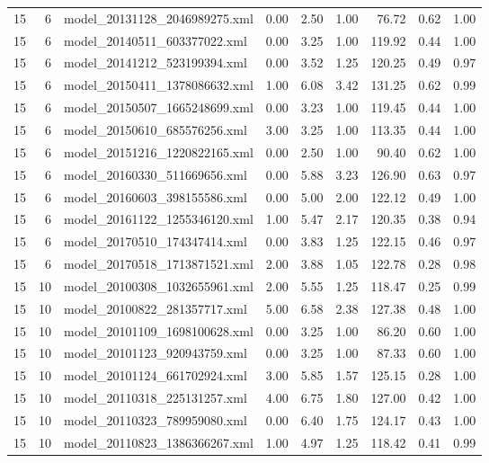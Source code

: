 \begin{table}[ht]
\begin{tabular}{rrlrrrrrr}
   15 &   6 & model\_20131128\_2046989275.xml & 0.00 & 2.50 & 1.00 & 76.72 & 0.62 & 1.00 \\ 
   15 &   6 & model\_20140511\_603377022.xml & 0.00 & 3.25 & 1.00 & 119.92 & 0.44 & 1.00 \\ 
   15 &   6 & model\_20141212\_523199394.xml & 0.00 & 3.52 & 1.25 & 120.25 & 0.49 & 0.97 \\ 
   15 &   6 & model\_20150411\_1378086632.xml & 1.00 & 6.08 & 3.42 & 131.25 & 0.62 & 0.99 \\ 
   15 &   6 & model\_20150507\_1665248699.xml & 0.00 & 3.23 & 1.00 & 119.45 & 0.44 & 1.00 \\ 
   15 &   6 & model\_20150610\_685576256.xml & 3.00 & 3.25 & 1.00 & 113.35 & 0.44 & 1.00 \\ 
   15 &   6 & model\_20151216\_1220822165.xml & 0.00 & 2.50 & 1.00 & 90.40 & 0.62 & 1.00 \\ 
   15 &   6 & model\_20160330\_511669656.xml & 0.00 & 5.88 & 3.23 & 126.90 & 0.63 & 0.97 \\ 
   15 &   6 & model\_20160603\_398155586.xml & 0.00 & 5.00 & 2.00 & 122.12 & 0.49 & 1.00 \\ 
   15 &   6 & model\_20161122\_1255346120.xml & 1.00 & 5.47 & 2.17 & 120.35 & 0.38 & 0.94 \\ 
   15 &   6 & model\_20170510\_174347414.xml & 0.00 & 3.83 & 1.25 & 122.15 & 0.46 & 0.97 \\ 
   15 &   6 & model\_20170518\_1713871521.xml & 2.00 & 3.88 & 1.05 & 122.78 & 0.28 & 0.98 \\ 
   15 &  10 & model\_20100308\_1032655961.xml & 2.00 & 5.55 & 1.25 & 118.47 & 0.25 & 0.99 \\ 
   15 &  10 & model\_20100822\_281357717.xml & 5.00 & 6.58 & 2.38 & 127.38 & 0.48 & 1.00 \\ 
   15 &  10 & model\_20101109\_1698100628.xml & 0.00 & 3.25 & 1.00 & 86.20 & 0.60 & 1.00 \\ 
   15 &  10 & model\_20101123\_920943759.xml & 0.00 & 3.25 & 1.00 & 87.33 & 0.60 & 1.00 \\ 
   15 &  10 & model\_20101124\_661702924.xml & 3.00 & 5.85 & 1.57 & 125.15 & 0.28 & 1.00 \\ 
   15 &  10 & model\_20110318\_225131257.xml & 4.00 & 6.75 & 1.80 & 127.00 & 0.42 & 1.00 \\ 
   15 &  10 & model\_20110323\_789959080.xml & 0.00 & 6.40 & 1.75 & 124.17 & 0.43 & 1.00 \\ 
   15 &  10 & model\_20110823\_1386366267.xml & 1.00 & 4.97 & 1.25 & 118.42 & 0.41 & 0.99 \\ 

\end{tabular}
\end{table}

